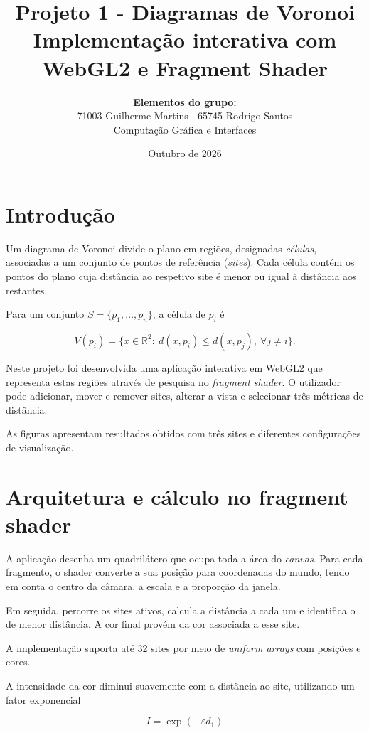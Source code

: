 \documentclass[10pt,a4paper]{article}
\title{
    \vspace{-1.3cm}
    \textbf{Projeto 1 - Diagramas de Voronoi}\\
    \large Implementação interativa com WebGL2 e Fragment Shader
}
\author{
    \textbf{Elementos do grupo:}\\
    71003 Guilherme Martins | 65745 Rodrigo Santos\\
    \small Computação Gráfica e Interfaces
}
\date{Outubro de 2026}
\begin{document}
\maketitle
\vspace{-0.7cm}

\section{Introdução}

Um diagrama de Voronoi divide o plano em regiões, designadas \emph{células}, associadas a um conjunto de pontos de referência (\emph{sites}). Cada célula contém os pontos do plano cuja distância ao respetivo site é menor ou igual à distância aos restantes.

Para um conjunto $S=\{p_1,\ldots,p_n\}$, a célula de $p_i$ é

\begin{equation}
V(p_i)=\{x\in\mathbb{R}^2:\ d(x,p_i)\leq d(x,p_j),\ \forall j\neq i\}.
\end{equation}

Neste projeto foi desenvolvida uma aplicação interativa em WebGL2 que representa estas regiões através de pesquisa no \emph{fragment shader}. O utilizador pode adicionar, mover e remover sites, alterar a vista e selecionar três métricas de distância.

As figuras apresentam resultados obtidos com três sites e diferentes configurações de visualização.

\section{Arquitetura e cálculo no fragment shader}

A aplicação desenha um quadrilátero que ocupa toda a área do \emph{canvas}. Para cada fragmento, o shader converte a sua posição para coordenadas do mundo, tendo em conta o centro da câmara, a escala e a proporção da janela.

Em seguida, percorre os sites ativos, calcula a distância a cada um e identifica o de menor distância. A cor final provém da cor associada a esse site.

A implementação suporta até 32 sites por meio de \emph{uniform arrays} com posições e cores.

A intensidade da cor diminui suavemente com a distância ao site, utilizando um fator exponencial

\[
I=\exp(-\varepsilon d_1)
\]
\end{document}
